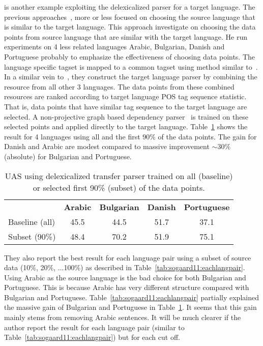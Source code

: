 \textbf{} is another example exploiting the delexicalized parser for a target language. The previous approaches~\cite{McDonald:2011:MTD,Zeman08cross-languageparser}, more or less focused on choosing the source language that is similar to the target language. This approach investigate on choosing the data points from source language that are similar with the target language. He run experiments on 4 less related languages Arabic, Bulgarian, Danish and Portuguese probably to emphasize the effectiveness of choosing data points. The language specific tagset is mapped to a common tagset using method similar to~\cite{Zeman08cross-languageparser}. In a similar vein to~\cite{McDonald:2011:MTD}, they construct the target language parser by combining the resource from all other 3 languages. The data points from these combined resources are ranked according to target language POS tag sequence statistic. That is, data points that have similar tag sequence to the target language are selected. A non-projective graph based dependency parser~\cite{McDonald:2005:NDP} is trained on these selected points and applied directly to the target language. Table~\ref{tab:sogaard11:subset} shows the result for 4 languages using all and the first 90\% of the data points. The gain for Danish and Arabic are modest compared to massive improvement $\sim 30\%$ (absolute) for Bulgarian and Portuguese. 
\begin{table}
\centering 
\begin{tabular}{lcccc}
               & \textbf{Arabic} & \textbf{Bulgarian} & \textbf{Danish} & \textbf{Portuguese} \\
Baseline (all) & 45.5   & 44.5      & 51.7   & 37.1       \\
Subset (90\%)  & 48.4   & 70.2      & 51.9   & 75.1      
\end{tabular}
\caption{UAS using delexicalized transfer parser trained on all  (baseline) or selected first 90\% (subset) of the data points. }
\label{tab:sogaard11:subset}
\end{table}

They also report the best result for each language pair using a subset of source data (10\%, 20\%, ...100\%) as described in Table~\ref{tab:sogaard11:eachlangpair}. Using Arabic as the source language is the bad choice for both Bulgarian and Portuguese. This is because Arabic has very different structure compared with Bulgarian and Portuguese. Table~\ref{tab:sogaard11:eachlangpair} partially explained the massive gain of Bulgarian and Portuguese in Table~\ref{tab:sogaard11:subset}. It seems that this gain mainly stems from removing Arabic sentences. It will be much clearer if the author report the result for each language pair (similar to Table~\ref{tab:sogaard11:eachlangpair}) but for each cut off. 


